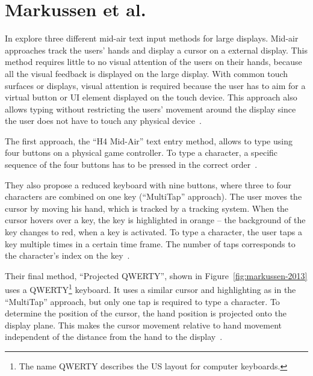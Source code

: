 \section{Markussen et al.}\label{section:markussen-2013}
In {} \citeauthor{Markussen.2013} explore three different mid-air text input methods for large displays. Mid-air approaches track the users' hands and display a cursor on a external display. This method requires little to no visual attention of the users on their hands, because all the visual feedback is displayed on the large display. With common touch surfaces or displays, visual attention is required because the user has to aim for a virtual button or \gls{UI} element displayed on the touch device.
This approach also allows typing without restricting the users' movement around the display since the user does not have to touch any physical device~\cite[401]{Markussen.2013}.

The first approach, the \enquote{H4 Mid-Air} text entry method, allows to type using four buttons on a physical game controller. To type a character, a specific sequence of the four buttons has to be pressed in the correct order~\cite[406]{Markussen.2013}.

They also propose a reduced keyboard with nine buttons, where three to four characters are combined on one key (\enquote{MultiTap} approach). The user moves the cursor by moving his hand, which is tracked by a tracking system. When the cursor hovers over a key, the key is highlighted in orange -- the background of the key changes to red, when a key is activated. To type a character, the user taps a key multiple times in a certain time frame. The number of taps corresponds to the character's index on the key~\cite[407]{Markussen.2013}. %

Their final method, \enquote{Projected QWERTY}, shown in Figure~\ref{fig:markussen-2013} uses a QWERTY\footnote{The name QWERTY describes the US layout for computer keyboards.} keyboard. It uses a similar cursor and highlighting as in the \enquote{MultiTap} approach, but only one tap is required to type a character. To determine the position of the cursor, the hand position is projected onto the display plane. This makes the cursor movement relative to hand movement independent of the distance from the hand to the display~\cite[408]{Markussen.2013}. 

